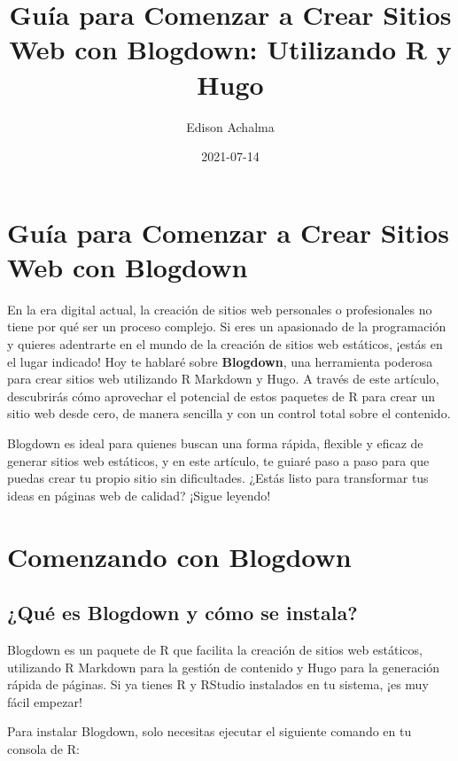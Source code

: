 \documentclass[
  doc,
  floatsintext,
  longtable,
  a4paper,
  nolmodern,
  notxfonts,
  notimes,
  colorlinks=true,linkcolor=blue,citecolor=blue,urlcolor=blue]{apa7}
\title{Guía para Comenzar a Crear Sitios Web con Blogdown: Utilizando R
y Hugo}
\author{Edison Achalma}
\affiliation{
{Escuela Profesional de Economía, Universidad Nacional de San Cristóbal
de Huamanga}}
\date{2021-07-14}
\begin{document}
\maketitle

\hypertarget{toc}{}
\tableofcontents
\newpage
\section[Introduction]{Guía para Comenzar a Crear Sitios Web con
Blogdown}

\setcounter{secnumdepth}{-\maxdimen} %

\setlength\LTleft{0pt}


En la era digital actual, la creación de sitios web personales o
profesionales no tiene por qué ser un proceso complejo. Si eres un
apasionado de la programación y quieres adentrarte en el mundo de la
creación de sitios web estáticos, ¡estás en el lugar indicado! Hoy te
hablaré sobre \textbf{Blogdown}, una herramienta poderosa para crear
sitios web utilizando R Markdown y Hugo. A través de este artículo,
descubrirás cómo aprovechar el potencial de estos paquetes de R para
crear un sitio web desde cero, de manera sencilla y con un control total
sobre el contenido.

Blogdown es ideal para quienes buscan una forma rápida, flexible y
eficaz de generar sitios web estáticos, y en este artículo, te guiaré
paso a paso para que puedas crear tu propio sitio sin dificultades.
¿Estás listo para transformar tus ideas en páginas web de calidad?
¡Sigue leyendo!

\section{Comenzando con Blogdown}\label{comenzando-con-blogdown}

\subsection{¿Qué es Blogdown y cómo se
instala?}\label{quuxe9-es-blogdown-y-cuxf3mo-se-instala}

Blogdown es un paquete de R que facilita la creación de sitios web
estáticos, utilizando R Markdown para la gestión de contenido y Hugo
para la generación rápida de páginas. Si ya tienes R y RStudio
instalados en tu sistema, ¡es muy fácil empezar!

Para instalar Blogdown, solo necesitas ejecutar el siguiente comando en
tu consola de R:
\end{document}
